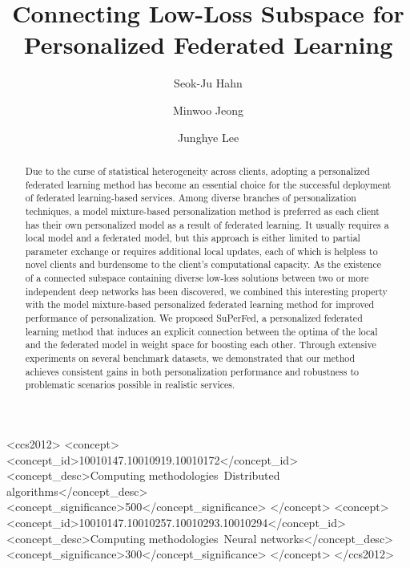 \documentclass[sigconf]{acmart}
\begin{document}
\title{Connecting Low-Loss Subspace for Personalized Federated Learning}

\author{Seok-Ju Hahn}
\author{Minwoo Jeong}
\author{Junghye Lee}

\begin{abstract}
   Due to the curse of statistical heterogeneity across clients, adopting a personalized federated learning method has become an essential choice for the successful deployment of federated learning-based services. Among diverse branches of personalization techniques, a model mixture-based personalization method is preferred as each client has their own personalized model as a result of federated learning. It usually requires a local model and a federated model, but this approach is either limited to partial parameter exchange or requires additional local updates, each of which is helpless to novel clients and burdensome to the client's computational capacity. As the existence of a connected subspace containing diverse low-loss solutions between two or more independent deep networks has been discovered, we combined this interesting property with the model mixture-based personalized federated learning method for improved performance of personalization. We proposed SuPerFed, a personalized federated learning method that induces an explicit connection between the optima of the local and the federated model in weight space for boosting each other. Through extensive experiments on several benchmark datasets, we demonstrated that our method achieves consistent gains in both personalization performance and robustness to problematic scenarios possible in realistic services.
\end{abstract}

\begin{CCSXML}
<ccs2012>
   <concept>
       <concept_id>10010147.10010919.10010172</concept_id>
       <concept_desc>Computing methodologies~Distributed algorithms</concept_desc>
       <concept_significance>500</concept_significance>
       </concept>
   <concept>
       <concept_id>10010147.10010257.10010293.10010294</concept_id>
       <concept_desc>Computing methodologies~Neural networks</concept_desc>
       <concept_significance>300</concept_significance>
       </concept>
 </ccs2012>
\end{CCSXML}
\end{document}
